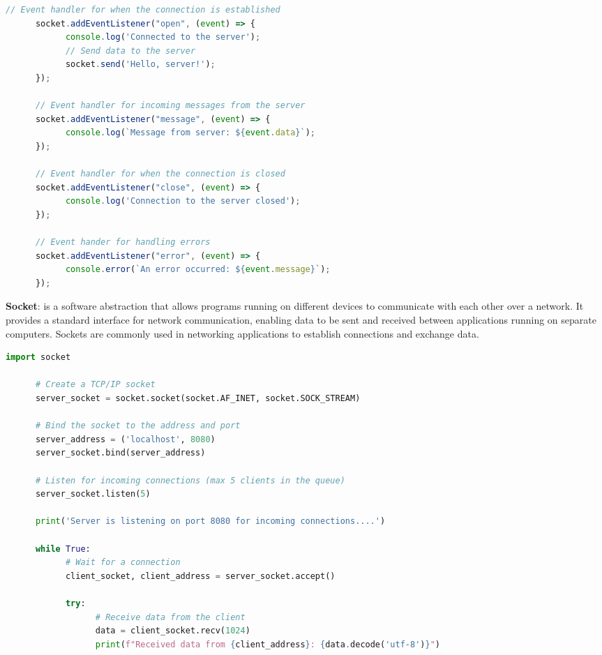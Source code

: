 \begin{multicols}{2}
\begin{lstlisting}[language=JavaScript, caption=WebSocket's Example]
      // Event handler for when the connection is established
      socket.addEventListener("open", (event) => {
            console.log('Connected to the server');
            // Send data to the server
            socket.send('Hello, server!');
      });

      // Event handler for incoming messages from the server
      socket.addEventListener("message", (event) => {
            console.log(`Message from server: ${event.data}`);	
      });

      // Event handler for when the connection is closed
      socket.addEventListener("close", (event) => {
            console.log('Connection to the server closed');
      });

      // Event hander for handling errors
      socket.addEventListener("error", (event) => {
            console.error(`An error occurred: ${event.message}`);
      });
\end{lstlisting}

\begin{multicols}{2}
      \textbf{Socket}: is a software abstraction that allows programs running on different devices to
      communicate with each other over a network. It provides a standard interface for network
      communication, enabling data to be sent and received between applications running on separate
      computers. Sockets are commonly used in networking applications to establish connections and
      exchange data.
\end{multicols}

\begin{lstlisting}[language=Python, caption=TCP Server Example Using Sockets in Python]
      import socket

      # Create a TCP/IP socket
      server_socket = socket.socket(socket.AF_INET, socket.SOCK_STREAM)

      # Bind the socket to the address and port
      server_address = ('localhost', 8080)
      server_socket.bind(server_address)

      # Listen for incoming connections (max 5 clients in the queue)
      server_socket.listen(5)

      print('Server is listening on port 8080 for incoming connections....')

      while True:
            # Wait for a connection
            client_socket, client_address = server_socket.accept()

            try:
                  # Receive data from the client
                  data = client_socket.recv(1024)
                  print(f"Received data from {client_address}: {data.decode('utf-8')}")


\end{lstlisting}
\end{multicols}
